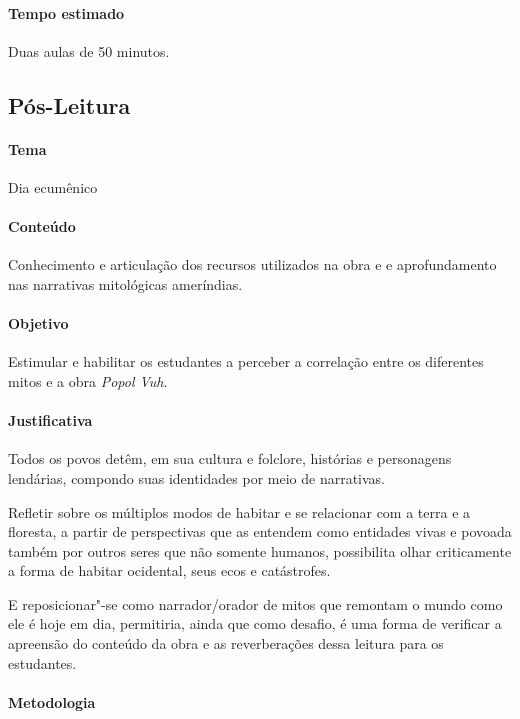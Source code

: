 \documentclass[11pt]{extarticle}
\begin{document}
\paragraph{Tempo estimado} Duas aulas de 50 minutos. 

\subsection{Pós-Leitura}

\paragraph{Tema} Dia ecumênico 

\paragraph{Conteúdo} Conhecimento e articulação dos recursos utilizados na obra e 
e aprofundamento nas narrativas mitológicas ameríndias.

\paragraph{Objetivo} Estimular e habilitar os estudantes a perceber a 
correlação entre os diferentes mitos e a obra \emph{Popol Vuh}.

\paragraph{Justificativa} Todos os povos detêm, em sua cultura e folclore,
histórias e personagens lendárias, compondo suas identidades por meio de
narrativas. 

Refletir sobre os múltiplos modos de habitar e se relacionar com a terra e 
a floresta, a partir de perspectivas que as entendem como entidades vivas e povoada 
também por outros seres que não somente humanos, possibilita
olhar criticamente a forma de habitar ocidental, seus ecos e catástrofes.

E reposicionar"-se como narrador/orador de mitos que remontam o mundo como ele é hoje em dia, 
permitiria, ainda que como desafio, é uma forma de 
verificar a apreensão do conteúdo da obra e as reverberações dessa leitura para os estudantes. 

\paragraph{Metodologia} 
\end{document}
